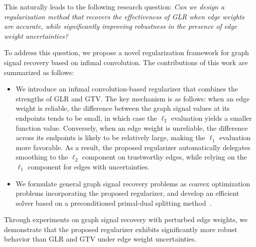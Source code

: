 This naturally leads to the following research question:  
\emph{Can we design a regularization method that recovers the effectiveness of GLR when edge weights are accurate, while significantly improving robustness in the presence of edge weight uncertainties?}

To address this question, we propose a novel regularization framework for graph signal recovery based on infimal convolution. 
The contributions of this work are summarized as follows:
\begin{itemize}
    \item We introduce an infimal convolution-based regularizer that combines the strengths of GLR and GTV. 
    The key mechanism is as follows: when an edge weight is reliable, the difference between the graph signal values at its endpoints tends to be small, in which case the $\ell_{2}$ evaluation yields a smaller function value. 
    Conversely, when an edge weight is unreliable, the difference across its endpoints is likely to be relatively large, making the $\ell_{1}$ evaluation more favorable. 
    As a result, the proposed regularizer automatically delegates smoothing to the $\ell_{2}$ component on trustworthy edges, while relying on the $\ell_{1}$ component for edges with uncertainties.
    \item We formulate general graph signal recovery problems as convex optimization problems incorporating the proposed regularizer, and develop an efficient solver based on a preconditioned primal-dual splitting method~\cite{pock2011diagonal,naganuma2023variable}.
\end{itemize}
Through experiments on graph signal recovery with perturbed edge weights, we demonstrate that the proposed regularizer exhibits significantly more robust behavior than GLR and GTV under edge weight uncertainties.